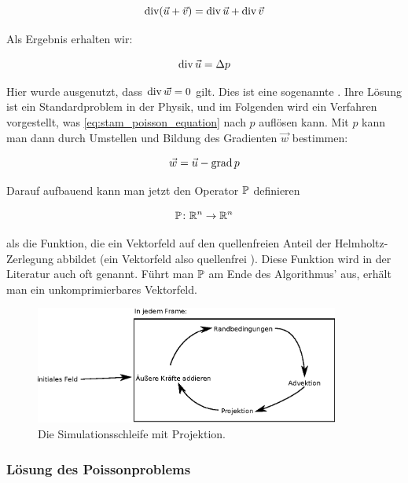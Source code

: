 \begin{equation}
\operatorname*{div} (\vec{u} + \vec{v}) = \operatorname*{div} \vec{u} + \operatorname*{div} \vec{v}
\end{equation}

Als Ergebnis erhalten wir:

\begin{equation}
\label{eq:stam_poisson_equation}
\operatorname*{div} \vec{u} = \Delta p
\end{equation}

Hier wurde ausgenutzt, dass $\operatorname*{div} \vec{w} = 0$ gilt. Dies ist eine
sogenannte . Ihre Lösung ist ein
Standardproblem in der Physik, und im Folgenden wird ein Verfahren vorgestellt,
was \autoref{eq:stam_poisson_equation} nach $p$ auflösen kann. Mit $p$ kann man
dann durch Umstellen und Bildung des Gradienten $\vec{w}$ bestimmen:

\begin{equation}
\vec{w} = \vec{u} - \operatorname*{grad} p
\end{equation}

Darauf aufbauend kann man jetzt den Operator $\mathbb{P}$ definieren

\begin{equation}
\mathbb{P} \colon \mathbb{R}^n \to \mathbb{R}^n
\end{equation}

als die Funktion, die ein Vektorfeld auf den quellenfreien Anteil der
Helmholtz-Zerlegung abbildet (ein Vektorfeld also quellenfrei
). Diese Funktion wird in der Literatur auch oft
 genannt. Führt man $\mathbb{P}$ am Ende des
Algorithmus' aus, erhält man ein unkomprimierbares Vektorfeld.

\begin{figure}[ht]
\includegraphics[width=10cm]{images/stam_loop_with_projection}
\caption{Die Simulationsschleife mit Projektion.}
\end{figure}

\subsubsection{Lösung des Poissonproblems}

